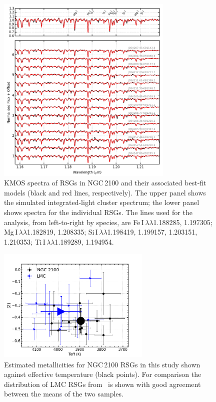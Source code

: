 \begin{figure}
 \begin{center}
 \centering
\includegraphics[width=0.75\textwidth]{ngc2100/NGC2100-model-fits}
\caption[KMOS spectra and best-fit model spectra in NGC\,2100]{KMOS spectra of RSGs in NGC\,2100 and their associated best-fit models
(black and red lines, respectively).
The upper panel shows the simulated integrated-light cluster spectrum;
the lower panel shows spectra for the individual RSGs.
The lines used for the analysis, from left-to-right by species, are
Fe\,{\scriptsize I}$\,\lambda\lambda$1.188285,
1.197305;
Mg\,{\scriptsize I}$\,\lambda\lambda$1.182819,
1.208335;
Si\,{\scriptsize I}$\,\lambda\lambda$1.198419,
1.199157,
1.203151,
1.210353;
Ti\,{\scriptsize I}$\,\lambda\lambda$1.189289,
1.194954.\label{fig:model_fits}}
\end{center}
\end{figure}

\begin{figure}
\centering
 \includegraphics[width=0.65\textwidth]{ngc2100/NGC2100-TeffvsZ-2100-LMC}
 \caption[Effective temperature as a function of metallicity for NGC\,2100]{Estimated metallicities for NGC\,2100 RSGs in this study shown against effective temperature (black points).
        For comparison the distribution of LMC RSGs from~\citet[][blue triangles]{2015ApJ...806...21D} is shown with good agreement between the means of the two samples.
\label{fig:TeffvsZ}
          }
\end{figure}

